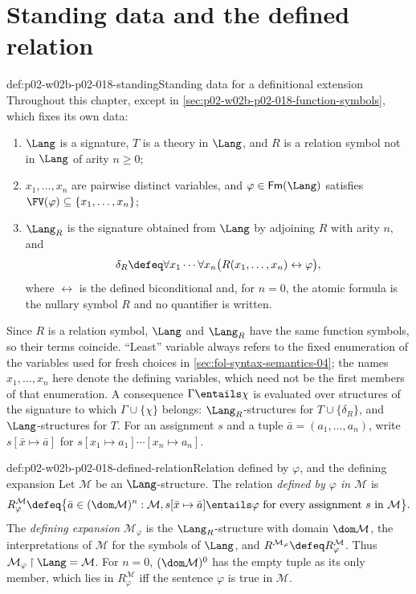 \section{Standing data and the defined relation}
\label{sec:p02-w02b-p02-018-standing}

\begin{hbconvention}{def:p02-w02b-p02-018-standing}{Standing data for a definitional extension}
Throughout this chapter, except in
\cref{sec:p02-w02b-p02-018-function-symbols}, which fixes its own data:
\begin{enumerate}
 \item \(\Lang\) is a signature, \(T\) is a theory in \(\Lang\), and
       \(R\) is a relation symbol not in \(\Lang\) of arity \(n\geq0\);
 \item \(x_1,\ldots,x_n\) are pairwise distinct variables, and
       \(\varphi\in\mathsf{Fm}(\Lang)\) satisfies
       \(\FV(\varphi)\subseteq\{x_1,\ldots,x_n\}\);
 \item \(\Lang_R\) is the signature obtained from \(\Lang\) by adjoining
       \(R\) with arity \(n\), and
       \[
        \delta_R\defeq\forall x_1\cdots\forall x_n
        \bigl(R(x_1,\ldots,x_n)\leftrightarrow\varphi\bigr),
       \]
       where \(\leftrightarrow\) is the defined biconditional and, for
       \(n=0\), the atomic formula is the nullary symbol \(R\) and no
       quantifier is written.
\end{enumerate}
Since \(R\) is a relation symbol, \(\Lang\) and \(\Lang_R\) have the same
function symbols, so their terms coincide.  ``Least'' variable always
refers to the fixed enumeration of the variables used for fresh choices in
\cref{sec:fol-syntax-semantics-04}; the names \(x_1,\ldots,x_n\) here
denote the defining variables, which need not be the first members of that
enumeration.  A consequence \(\Gamma\entails\chi\) is evaluated over
structures of the signature to which \(\Gamma\cup\{\chi\}\) belongs:
\(\Lang_R\)-structures for \(T\cup\{\delta_R\}\), and \(\Lang\)-structures
for \(T\).  For an assignment \(s\) and a tuple
\(\bar a=(a_1,\ldots,a_n)\), write
\(s[\bar x\mapsto\bar a]\) for \(s[x_1\mapsto a_1]\cdots[x_n\mapsto a_n]\).
\end{hbconvention}

\begin{hbdefinition}{def:p02-w02b-p02-018-defined-relation}{Relation defined by \(\varphi\), and the defining expansion}
Let \(\mathcal M\) be an \(\Lang\)-structure.  The relation \emph{defined by
\(\varphi\) in \(\mathcal M\)} is
\[
 R^{\mathcal M}_{\varphi}\defeq
 \bigl\{\bar a\in(\dom\mathcal M)^n:
 \mathcal M,s[\bar x\mapsto\bar a]\entails\varphi
 \text{ for every assignment }s\text{ in }\mathcal M\bigr\}.
\]
The \emph{defining expansion} \(\mathcal M_{\varphi}\) is the
\(\Lang_R\)-structure with domain \(\dom\mathcal M\), the interpretations of
\(\mathcal M\) for the symbols of \(\Lang\), and
\(R^{\mathcal M_{\varphi}}\defeq R^{\mathcal M}_{\varphi}\).  Thus
\(\mathcal M_{\varphi}\mathbin{\upharpoonright}\Lang=\mathcal M\).  For
\(n=0\), \((\dom\mathcal M)^0\) has the empty tuple as its only member,
which lies in \(R^{\mathcal M}_{\varphi}\) iff the sentence \(\varphi\) is
true in \(\mathcal M\).
\end{hbdefinition}

